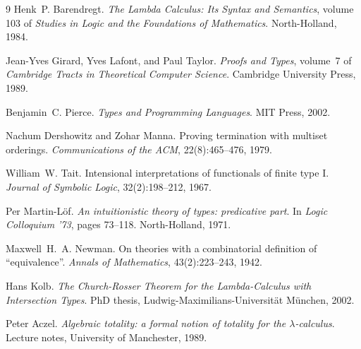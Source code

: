 \documentclass{article}
\theoremstyle{definition}
\begin{document}
\begin{thebibliography}{9}
  Henk~P. Barendregt.
  \emph{The Lambda Calculus: Its Syntax and Semantics}, volume 103 of
  \emph{Studies in Logic and the Foundations of Mathematics}.
  North-Holland, 1984.

  Jean-Yves Girard, Yves Lafont, and Paul Taylor.
  \emph{Proofs and Types}, volume~7 of \emph{Cambridge Tracts in
  Theoretical Computer Science}.
  Cambridge University Press, 1989.

  Benjamin~C. Pierce.
  \emph{Types and Programming Languages}.
  MIT Press, 2002.

  Nachum Dershowitz and Zohar Manna.
  Proving termination with multiset orderings.
  \emph{Communications of the ACM}, 22(8):465--476, 1979.

  William~W. Tait.
  Intensional interpretations of functionals of finite type I.
  \emph{Journal of Symbolic Logic}, 32(2):198--212, 1967.

  Per Martin-L\"of.
  \emph{An intuitionistic theory of types: predicative part}.
  In \emph{Logic Colloquium '73}, pages 73--118. North-Holland, 1971.

  Maxwell~H.~A. Newman.
  On theories with a combinatorial definition of ``equivalence''.
  \emph{Annals of Mathematics}, 43(2):223--243, 1942.

  Hans Kolb.
  \emph{The Church-Rosser Theorem for the Lambda-Calculus with
  Intersection Types}.
  PhD thesis, Ludwig-Maximilians-Universit\"at M\"unchen, 2002.

  Peter Aczel.
  \emph{Algebraic totality: a formal notion of totality for the
  $\lambda$-calculus}.
  Lecture notes, University of Manchester, 1989.
\end{thebibliography}
\end{document}

